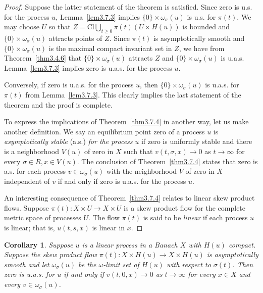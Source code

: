 \documentclass{surv-l}
\theoremstyle{plain}
\newtheorem{corollary}[theorem]{Corollary}
\theoremstyle{definition}
\numberwithin{equation}{section}
\numberwithin{figure}{chapter}
\begin{document}
\begin{proof} Suppose the latter statement of the theorem is satisfied. Since zero is u.s. for the process $u$, Lemma~\ref{lem3.7.3} implies $\{0\}\times\omega_{\sigma}(u)$ is u.s. for $\pi(t)$. We may choose $U$ so that $Z= \mathrm{Cl} \bigcup_{t\geq 0}\pi(t)(U\times H(u))$ is bounded and $\{0\}\times\omega_{\sigma}(u)$ attracts points of $Z$. Since $\pi(t)$ is asymptotically smooth and $\{0\}\times\omega_{\sigma}(u)$ is the maximal compact invariant set in $Z$, we have from Theorem~\ref{thm3.4.6} that $\{0\}\times\omega_{\sigma}(u)$ attracts $Z$ and $\{0\}\times\omega_{\sigma}(u)$ is u.a.s. Lemma~\ref{lem3.7.3} implies zero is u.a.s. for the process $u$.

Conversely, if zero is u.a.s. for the process $u$, then $\{0\}\times\omega_{\sigma}(u)$ is u.a.s. for $\pi(t)$ from Lemma~\ref{lem3.7.3}. This clearly implies the last statement of the theorem and the proof is complete.

To express the implications of Theorem~\ref{thm3.7.4} in another way, let us make another definition. We say an equilibrium point zero of a process $u$ is \emph{asymptotically stable} (a.s.) \emph{for the process} $u$ if zero is uniformly stable and there is a neighborhood $V(u)$ of zero in $X$ such that $v(t,\sigma,x)\rightarrow 0$ as $ t\rightarrow\infty$ for every $\sigma\in R,x\in V(u)$. The conclusion of Theorem~\ref{thm3.7.4} states that zero is a.s. for each process $v\in\omega_{\sigma}(u)$ with the neighborhood $V$ of zero in $X$ independent of $v$ if and only if zero is u.a.s. for the process $u$.

An interesting consequence of Theorem~\ref{thm3.7.4} relates to linear skew product flows. Suppose $\pi(t)\!:X\times U\rightarrow X\times U$ is a skew product flow for the complete metric space of processes $U$. The flow $\pi(t)$ is said to be \emph{linear} if each process $u$ is linear; that is, $u(t, s, x)$ is linear in $x$.
\end{proof}

\begin{corollary}\label{cor3.7.5} Suppose $u$ is a linear process in a Banach $X$ with $H(u)$
compact. Suppose the skew product flow $\pi(t)\!:X\times H(u)\rightarrow X\times H(u)$ is asymptotically smooth and let $\omega_{\sigma}(u)$ be the $\omega$-limit set of $H(u)$ with respect to $\sigma(t)$. Then zero is u.a.s. for $u$ if and only if $v(t,0,x)\rightarrow 0$ as $t\rightarrow\infty$ for every $x\in X$ and every $v\in\omega_{\sigma}(u)$.
\end{corollary}
\end{document}
